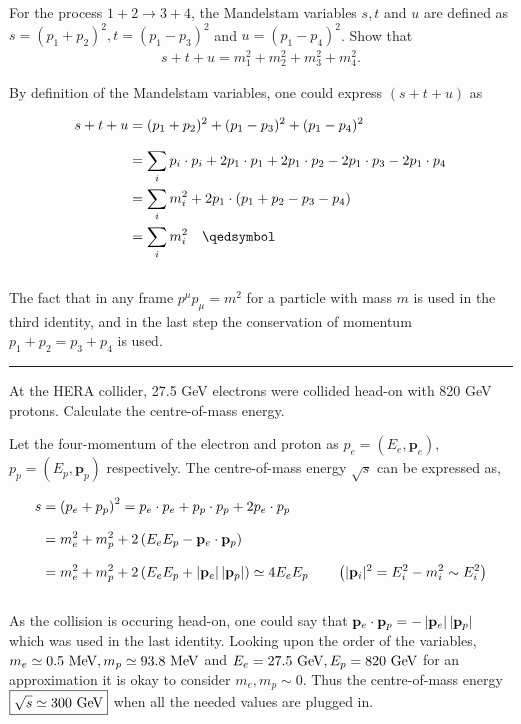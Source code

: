 \begin{problem}{2.12}
   For the process $1+2 \to 3+4$, the Mandelstam variables $s,t$ and $u$ are defined as $s=(p_1+p_2)^2,t=(p_1-p_3)^2$ and $u=(p_1-p_4)^2$. Show that
   \begin{align*}
        s+t+u = m_1^2+m_2^2+m_3^2+m_4^2.
   \end{align*} 
\end{problem}
\begin{solution}
    By definition of the Mandelstam variables, one could express $(s+t+u)$ as 
    
    \begin{align*}
        s+t+u &= (p_1+p_2)^2 + (p_1-p_3)^2 + (p_1-p_4)^2\\[0.1in]
              &= \sum_i p_i \cdot p_i  + 2p_1\cdot p_1  + 2p_1\cdot p_2 -2 p_1 \cdot p_3 - 2 p_1 \cdot p_4  \\  
              &= \sum_i m_i^2 + 2p_1\cdot(p_1+p_2-p_3-p_4) \\
              &= \sum_i m_i^2 \qed
    \end{align*}\\
    The fact that in any frame $p^\mu p_\mu =m^2$ for a particle with mass $m$ is used in the third identity, and in the last step the conservation of momentum $p_1+p_2 = p_3+p_4$ is used. 
\end{solution} 
    
\noindent\rule{7in}{1.5pt}


\begin{problem}{2.13}
 At the HERA collider, 27.5 GeV electrons were collided head-on with 820 GeV protons. Calculate the centre-of-mass energy.
\end{problem}
\begin{solution}
    Let the four-momentum of the electron and proton as $p_e = (E_e,\mathbf{p}_e),$ $p_p = (E_p,\mathbf{p}_p)$ respectively. The centre-of-mass energy $\sqrt{s}$ can be expressed as,
    
    \begin{align*}
        s &= \left( p_e + p_p \right)^2 = p_e\cdot p_e + p_p \cdot p_p + 2 p_e \cdot p_p \\[0.1in]
          &= m_e^2 + m_p^2 + 2 \left( E_e E_p - \mathbf{p}_e \cdot \mathbf{p}_p \right) \\[0.1in]
          &= m_e^2 + m_p^2 + 2 \left( E_eE_p + \left| \mathbf{p}_e \right| \left| \mathbf{p}_p \right| \right) \simeq 4 E_e E_p \quad \quad \left(  |\mathbf{p}_i|^2 = E_i^2 - m_i^2 \sim E_i^2  \right)
    \end{align*}\\
    As the collision is occuring head-on, one could say that $\mathbf{p}_e \cdot \mathbf{p}_p =- \left| \mathbf{p}_e \right| \left| \mathbf{p}_p \right| $ which was used in the last identity.
    Looking upon the order of the variables, $m_e \simeq 0.5 \text{ MeV}, m_p \simeq 93.8 \text{ MeV}$ and $E_e = 27.5 \text{ GeV}, E_p = 820 \text{ GeV}$ for an approximation it is okay to consider $m_e,m_p\sim 0$. Thus the centre-of-mass energy $\boxed{\sqrt{s}\simeq 300 \text{ GeV}}$ when all the needed values are plugged in.
\end{solution}
    
